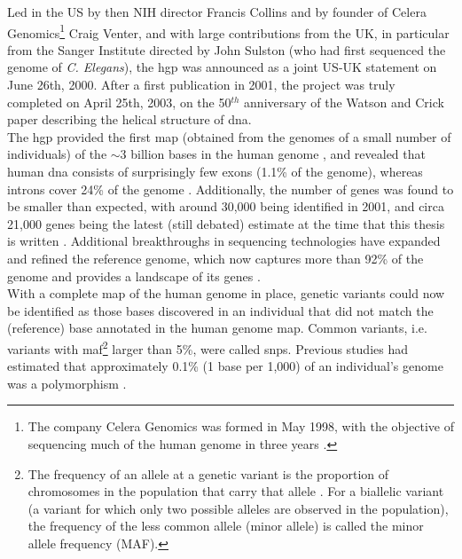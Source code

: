 Led in the US by then NIH director Francis Collins and by founder of Celera Genomics\footnote{The company Celera Genomics was formed in May 1998, with the objective of sequencing much of the human genome in three years
\cite{venter1998shotgun}.} 
Craig Venter, and with large contributions from the UK, in particular from the Sanger Institute directed by John Sulston (who had first sequenced the genome of \textit{C. Elegans}), the \gls{hgp} was announced as a joint US-UK statement on June 26th, 2000.
After a first publication in 2001, the project was truly completed on April 25th, 2003, on the 50$^{th}$ anniversary of the Watson and Crick paper describing the helical structure of \gls{dna}.\\

The \gls{hgp} provided the first map (obtained from the genomes of a small number of individuals) of the $\sim$3 billion bases in the human genome \cite{lander2001initial, schmutz2004quality, hattori2005finishing}, and revealed that human \gls{dna} consists of surprisingly few exons (1.1\% of the genome), whereas introns cover 24\% of the genome \cite{venter2001sequence, lander2001initial}. 
Additionally, the number of genes was found to be smaller than expected, with around 30,000 being identified in 2001, and circa 21,000 genes being the latest (still debated) estimate at the time that this thesis is written \cite{pertea2018thousands}. 
Additional breakthroughs in sequencing technologies have expanded and refined the reference genome, which now captures more than 92\% of the genome and provides a landscape of its 
genes \cite{lander2011initial}.\\

With a complete map of the human genome in place, genetic variants could now be identified as those bases discovered in an individual that did not match the (reference) base annotated in the human genome map. 
Common variants, i.e. variants with \gls{maf}\footnote{The frequency of an
allele at a genetic variant is the proportion of chromosomes in the population that
carry that allele \cite{laird2010fundamentals}. 
For a biallelic variant (a variant for which only two possible alleles are observed in the population), the frequency of the less common allele (minor allele) is called the minor allele frequency (MAF).} larger than 5\%, were called \glspl{snp}. 
Previous studies had estimated that approximately 0.1\% (1 base per 1,000) of an individual's genome was a polymorphism \cite{wang1998large, li1991low, cargill1999characterization}. 

